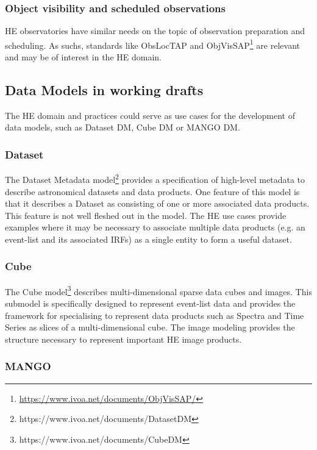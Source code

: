 \documentclass[11pt,a4paper]{ivoa}
\begin{document}
{\subsubsection{Object visibility and scheduled observations}

\gls{HE} observatories have similar needs on the topic of observation preparation and scheduling. As suchs, standards like ObsLocTAP \citep{2021ivoa.spec.0724S} and ObjVisSAP\footnote{\url{https://www.ivoa.net/documents/ObjVisSAP/}} are relevant and may be of interest in the \gls{HE} domain.


\subsection{Data Models in working drafts}

The \gls{HE} domain and practices could serve as use cases for the development of data models, such as Dataset DM, Cube DM or MANGO DM.

\subsubsection{Dataset}

The Dataset Metadata model\footnote{https://www.ivoa.net/documents/DatasetDM} provides a specification of high-level metadata to describe astronomical datasets and data products.
One feature of this model is that it describes a Dataset as consisting of one or more associated data products.  This feature is not
well fleshed out in the model.  The \gls{HE} use cases provide examples where it may be necessary to associate multiple data products
(e.g. an event-list and its associated \gls{IRF}s) as a single entity to form a useful dataset.

\subsubsection{Cube}

The Cube model\footnote{https://www.ivoa.net/documents/CubeDM} describes multi-dimensional sparse data cubes and images.  This submodel is specifically designed to
represent event-list data and provides the framework for specialising to represent data products such as Spectra and Time Series
as slices of a multi-dimensional cube.  The image modeling provides the structure necessary to represent important \gls{HE} image products.

\subsubsection{MANGO}

}
\end{document}
